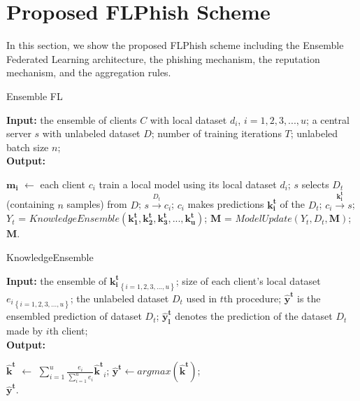 \documentclass[journal]{IEEEtran}
\begin{document}
\section{Proposed FLPhish Scheme}
In this section, we show the proposed FLPhish scheme including the Ensemble Federated Learning architecture, the phishing mechanism, the reputation mechanism, and the aggregation rules.

\begin{algorithm}[t]
  \caption{Ensemble FL} %
  \label{alg:system}
  \hspace*{0.02in} {\bf Input:} %
  the ensemble of clients $C$ with local dataset $d_i$, $i=1,2,3,...,u$; a central server $s$ with unlabeled dataset $D$; number of training iterations $T$; unlabeled batch size $n$;\\
  \hspace*{0.02in} {\bf Output:} %
  \begin{algorithmic}[1]
    \State $\mathbf{m_i}$ $\gets$ each client $c_i$ train a local model using its local dataset $d_i$;
      \State $s$ selects $D_t$ (containing $n$ samples) from $D$;
        \State $s \overset{D_{t}}{\rightarrow} c_{i}$;
        \State $c_i$ makes predictions $\mathbf{k_i^t}$ of the $D_t$;
        \State $c_i \overset{\mathbf{k_i^t}}{\rightarrow} s$;
      \EndFor
      \State $Y_t$ = $KnowledgeEnsemble(\mathbf{k_1^t},\mathbf{k_2^t},\mathbf{k_3^t},...,\mathbf{k_u^t})$;
      \State $\mathbf{M}$ = $ModelUpdate(Y_t, D_t, \mathbf{M})$;
    \EndFor \\
    \Return $\mathbf{M}$.
  \end{algorithmic}
\end{algorithm}
\begin{algorithm}[t]
  \caption{KnowledgeEnsemble} %
  \label{alg:KnowledgeEnsemble}
  \hspace*{0.02in} {\bf Input:} %
  the ensemble of ${\mathbf{k_i^t}}_{\left \{ i= 1,2,3,...,u \right \}}$; size of each client's local dataset ${e_i}_{\left \{ i= 1,2,3,...,u \right \}}$; the unlabeled dataset $D_t$ used in $t$th procedure; $\mathbf{\hat{y}^t}$ is the ensembled prediction of dataset $D_t$; $\mathbf{\hat{y}^t_l}$ denotes the prediction of the dataset $D_t$ made by $i$th client;\\
  \hspace*{0.02in} {\bf Output:} %
  \begin{algorithmic}[1]
      \State $\mathbf{\hat{k}^t}$ $\gets$ $\sum_{i=1}^{u}\frac{e_i}{\sum_{i=1}^{u}e_i}\mathbf{\hat{k}^t}_i$;
      \State $\mathbf{\hat{y}^t}\gets argmax(\mathbf{\hat{k}^t})$;
    \EndFor \\
    \Return $\mathbf{\hat{y}^t}$.
  \end{algorithmic}

\end{algorithm}
\end{document}
